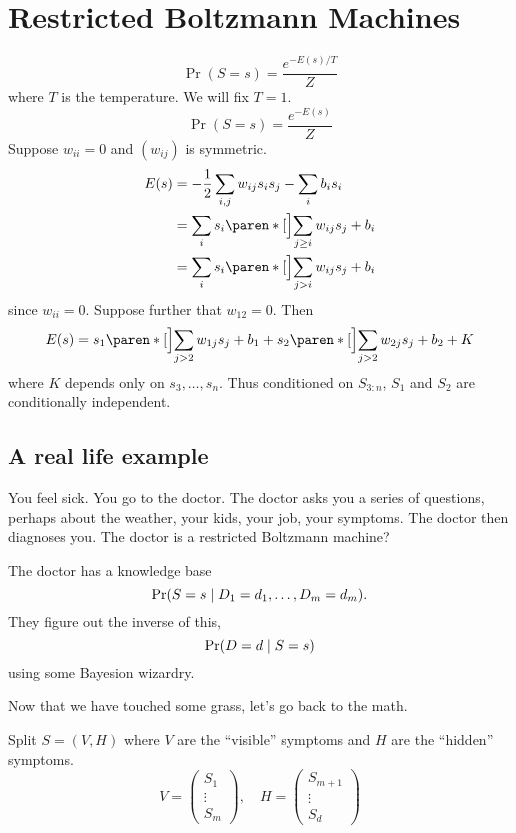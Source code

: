 \section{Restricted Boltzmann Machines} \label{sec:rbm}

\[
    \Pr(S = s) = \frac{e^{-E(s)/T}}{Z}
\] where $T$ is the temperature.
We will fix $T = 1$. \[
    \Pr(S = s) = \frac{e^{-E(s)}}{Z}
\]
Suppose $w_{ii} = 0$ and $(w_{ij})$ is symmetric.
\begin{align*}
    E(s) &= -\frac12 \sum_{i, j} w_{ij} s_i s_j - \sum_i b_i s_i \\
    &= \sum_i s_i \paren*[\Big]{\sum_{j \ge i} w_{ij} s_j + b_i} \\
    &= \sum_i s_i \paren*[\Big]{\sum_{j > i} w_{ij} s_j + b_i}
\end{align*} since $w_{i i} = 0$.
Suppose further that $w_{12} = 0$.
Then \[
    E(s) = s_1 \paren*[\Big]{\sum_{j > 2} w_{1j} s_j + b_1}
            + s_2 \paren*[\Big]{\sum_{j > 2} w_{2j} s_j + b_2}
            + K
\] where $K$ depends only on $s_3, \dots, s_n$.
Thus conditioned on $S_{3:n}$,
$S_1$ and $S_2$ are conditionally independent.

\subsection{A real life example} \label{sec:rbm:eg}
You feel sick.
You go to the doctor.
The doctor asks you a series of questions, perhaps about the weather,
your kids, your job, your symptoms.
The doctor then diagnoses you.
The doctor is a restricted Boltzmann machine?

The doctor has a knowledge base \[
    \Pr(S = s \mid D_1 = d_1, \dots, D_m = d_m).
\] They figure out the inverse of this, \[
    \Pr(D = d \mid S = s)
\] using some Bayesion wizardry.

Now that we have touched some grass, let's go back to the math.

Split $S = (V, H)$ where $V$ are the ``visible'' symptoms and $H$ are the
``hidden'' symptoms. \[
    V = \begin{pmatrix}
        S_1 \\
        \vdots \\
        S_m
    \end{pmatrix}, \quad
    H = \begin{pmatrix}
        S_{m+1} \\
        \vdots \\
        S_d
    \end{pmatrix}
\]

